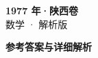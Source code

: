 \documentclass[zihao=-4, a4paper]{ctexart}
\begin{document}
\begin{center}
  {\Large\bfseries 1977 年·陕西卷}\\[4pt]
  {\large 数学 · 解析版}
\end{center}
\medskip
{}

\clearpage
{}
\begin{center}{\Large\bfseries 参考答案与详细解析}\end{center}
\medskip

\end{document}

